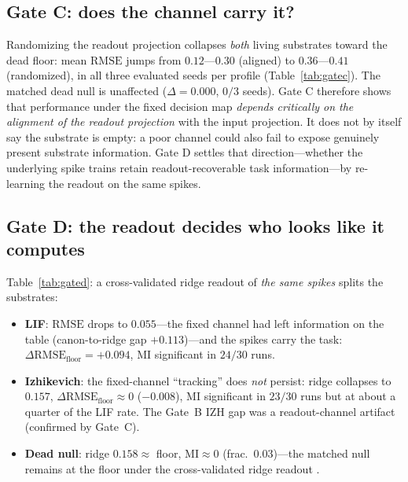 \documentclass[10pt,a4paper]{article}
\newcommand{\RMSE}{\ensuremath{\mathrm{RMSE}}}
\newcommand{\MI}{\ensuremath{\mathrm{MI}}}
\newcommand{\dfloor}{\ensuremath{\Delta\RMSE_{\mathrm{floor}}}}
\begin{document}
\subsection{Gate C: does the channel carry it?}\label{sec:gatecres}
\begin{table}[H]
\centering
\caption{Gate C: canonical $\RMSE$ under the aligned channel
($\mathbf{w}_r=\mathbf{g}$) vs.\ per-seed random readouts. ``$d$'' is
$\RMSE_{\mathrm{random}}-\RMSE_{\mathrm{aligned}}$; ``paired'' is the
fraction of seeds with $d>0$. Both living substrates collapse
(3/3 seeds); the matched dead null is unaffected.}
\label{tab:gatec}

\end{table}
Randomizing the readout projection collapses \emph{both} living
substrates toward the dead floor: mean $\RMSE$ jumps from $0.12$---$0.30$
(aligned) to $0.36$---$0.41$ (randomized), in all three evaluated seeds
per profile (Table~\ref{tab:gatec}). The matched dead null is
unaffected ($\Delta=0.000$, $0/3$ seeds). Gate C therefore shows that
performance under the fixed decision map \emph{depends critically on
the alignment of the readout projection} with the input projection.
It does not by itself say the substrate is empty: a poor channel could
also fail to expose genuinely present substrate information. Gate D
settles that direction---whether the underlying spike trains retain
readout-recoverable task information---by re-learning the readout on the
same spikes.

\subsection{Gate D: the readout decides who looks like it computes}\label{sec:gatedres}
\begin{table}[H]
\centering
\caption{Gate D: same spikes, decoder sweep (pooled 5 profiles
$\times$ 6 seeds). $\dfloor=$ $\RMSE_{\mathrm{meanpd}}-
\RMSE_{\mathrm{decoder}}$ is the RMSE improvement over the
mean-predictor (no-information) floor; $\MI$ in nats;
$\MI_{\mathrm{sig}}$ is the fraction of runs with significant $\MI$.}
\label{tab:gated}

\end{table}
Table~\ref{tab:gated}: a cross-validated ridge readout of
\emph{the same spikes} splits the substrates:
\begin{itemize}[nosep]
\item \textbf{LIF}: $\RMSE$ drops to $0.055$---the fixed channel had
left information on the table (canon-to-ridge gap $+0.113$)---and the
spikes carry the task: $\dfloor=+0.094$, $\MI$ significant in
$24/30$ runs.
\item \textbf{Izhikevich}: the fixed-channel ``tracking'' does
\emph{not} persist: ridge collapses to $0.157$, $\dfloor\approx0$
($-0.008$), $\MI$ significant in $23/30$ runs but at about a quarter
of the LIF rate. The Gate~B IZH gap was a readout-channel artifact
(confirmed by Gate~C).
\item \textbf{Dead null}: ridge $0.158\approx$ floor, $\MI\approx0$
(frac.\ $0.03$)---the matched null remains at the floor under the
cross-validated ridge readout \cite{hoerl1970,paninski2004}.
\end{itemize}
\end{document}
